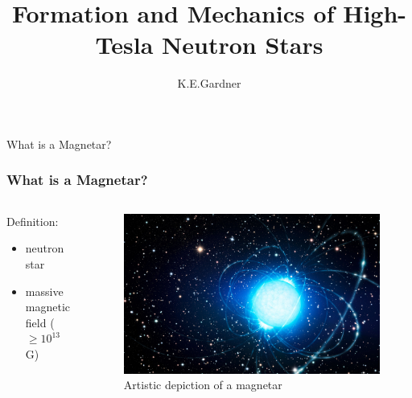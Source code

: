 \documentclass[hyperref=pdftex, presentation]{beamer}
\title[Introduction to Magnetars] %
{Formation and Mechanics of High-Tesla Neutron Stars}
\author[Gardner]{K.E.Gardner}
\institute[] {UTU - Department of Physics\\}
\date[\today]
\begin{document}
\begin{frame}
	\vspace*{-.5cm}
  \titlepage
\end{frame}




\begin{frame}{\Large What is a Magnetar?}
\frametitle{\Large What is a Magnetar?}

\begin{minipage}[0.2\textheight]{\textwidth}
\begin{columns}[T]
\begin{column}{0.5\textwidth}

\begin{block}{Definition:}

\begin{itemize}
 \item<2-> neutron star%
 \item<3-> massive magnetic field ($\ge 10^{13}$ G)
\end{itemize}
\end{block}

\end{column}
\begin{column}{0.5\textwidth}
	\begin{figure}
		\includegraphics[scale=.09]{figures/magnetar_art.jpg}
		\caption{Artistic depiction of a magnetar}
	\end{figure}
\end{column}
\end{columns}
\end{minipage}

\end{frame}
\end{document}
